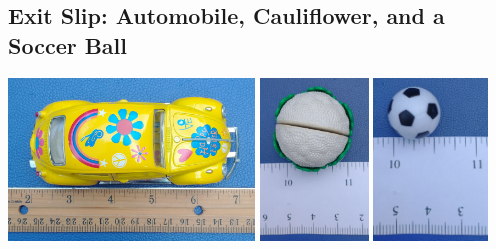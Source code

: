 \wbnewpage
\subsection{Exit Slip: Automobile, Cauliflower, and a Soccer Ball}
\begin{center}
\includegraphics[height=1.7in]{images/lovebug} \includegraphics[height=1.7in]{images/cauliflower} \includegraphics[height=1.7in]{images/soccerball}
\end{center}
